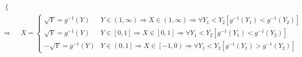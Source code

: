 \documentclass[
]{book}
\theoremstyle{definition}
\theoremstyle{definition}
\theoremstyle{definition}
\theoremstyle{definition}
\theoremstyle{remark}
\begin{document}
\[\begin{aligned}
\begin{cases}
\end{cases}\\
\Rightarrow & X=\begin{cases}
\sqrt{Y}=g^{-1}\left(Y\right) & Y\in\left(1,\infty\right)\Rightarrow X\in\left(1,\infty\right)\Rightarrow\forall Y_{{\scriptscriptstyle 1}}<Y_{{\scriptscriptstyle 2}}\left[g^{-1}\left(Y_{{\scriptscriptstyle 1}}\right)<g^{-1}\left(Y_{{\scriptscriptstyle 2}}\right)\right]\\
\sqrt{Y}=g^{-1}\left(Y\right) & Y\in\left[0,1\right]\Rightarrow X\in\left[0,1\right]\Rightarrow\forall Y_{{\scriptscriptstyle 1}}<Y_{{\scriptscriptstyle 2}}\left[g^{-1}\left(Y_{{\scriptscriptstyle 1}}\right)<g^{-1}\left(Y_{{\scriptscriptstyle 2}}\right)\right]\\
-\sqrt{Y}=g^{-1}\left(Y\right) & Y\in\left(0,1\right]\Rightarrow X\in\left[-1,0\right)\Rightarrow\forall Y_{{\scriptscriptstyle 1}}<Y_{{\scriptscriptstyle 2}}\left[g^{-1}\left(Y_{{\scriptscriptstyle 1}}\right)>g^{-1}\left(Y_{{\scriptscriptstyle 2}}\right)\right]
\end{cases}
\end{aligned}
\]
\end{document}
